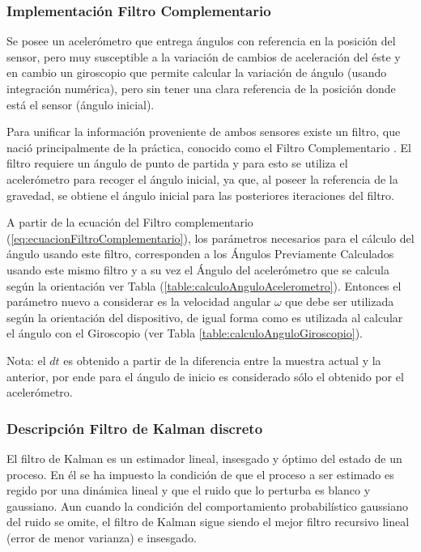 \documentclass[12pt,a4paper]{article}
\begin{document}
\subsubsection{Implementación Filtro Complementario}
Se posee un acelerómetro que entrega ángulos con referencia en la posición del sensor, pero muy susceptible a la variación de cambios de aceleración del éste y en cambio un giroscopio que permite calcular la variación de ángulo (usando integración numérica), pero sin tener una clara referencia de la posición donde está el sensor (ángulo inicial).

Para unificar la información proveniente de ambos sensores existe un filtro, que nació principalmente de la práctica, conocido como el Filtro Complementario \cite{TesisUSM}.
El filtro requiere un ángulo de punto de partida y para esto se utiliza el acelerómetro para recoger el ángulo inicial, ya que, al poseer la referencia de la gravedad, se obtiene el ángulo inicial para las posteriores iteraciones del filtro.


A partir de la ecuación del Filtro complementario (\ref{eq:ecuacionFiltroComplementario}), los parámetros necesarios para el cálculo del ángulo usando este filtro, corresponden a los Ángulos Previamente Calculados usando este mismo filtro y a su vez el Ángulo del acelerómetro que se calcula según la orientación ver Tabla (\ref{table:calculoAnguloAcelerometro}).
Entonces el parámetro nuevo a considerar es la velocidad angular $\omega$ que debe ser utilizada según la orientación del dispositivo, de igual forma como es utilizada al calcular el ángulo con el Giroscopio (ver Tabla \ref{table:calculoAnguloGiroscopio}).


Nota: el $dt$ es obtenido a partir de la diferencia entre la muestra actual y la anterior, por ende para el ángulo de inicio es considerado sólo el obtenido por el acelerómetro.

\subsubsection{Descripción Filtro de Kalman discreto}
El filtro de Kalman es un estimador lineal, insesgado y óptimo del estado de un proceso. En él se ha impuesto la condición de que el proceso a ser estimado es regido por una dinámica lineal y que el ruido que lo perturba es blanco y gaussiano. Aun cuando la condición del comportamiento probabilístico gaussiano del ruido se omite, el filtro de Kalman sigue siendo el mejor filtro recursivo lineal (error de menor varianza) e insesgado\cite{TesisUSM}.
\end{document}
